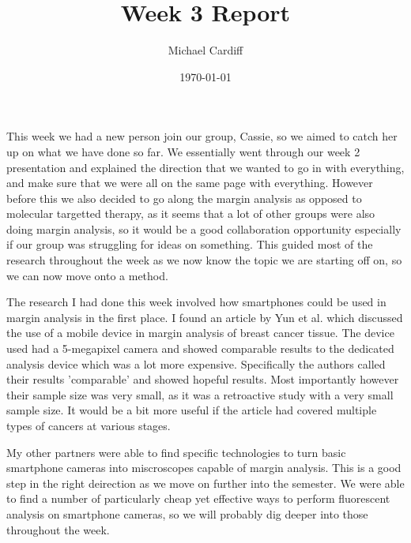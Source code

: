 \documentclass[12pt]{article}
\title{Week 3 Report}
\author{Michael Cardiff}
\date{\today}
\begin{document}
\maketitle

This week we had a new person join our group, Cassie, so we aimed to catch her up on what we have done so far. We essentially went through our week 2 presentation and explained the direction that we wanted to go in with everything, and make sure that we were all on the same page with everything. However before this we also decided to go along the margin analysis as opposed to molecular targetted therapy, as it seems that a lot of other groups were also doing margin analysis, so it would be a good collaboration opportunity especially if our group was struggling for ideas on something. This guided most of the research throughout the week as we now know the topic we are starting off on, so we can now move onto a method.

The research I had done this week involved how smartphones could be used in margin analysis in the first place. I found an article by Yun et al. which discussed the use of a mobile device in margin analysis of breast cancer tissue. The device used had a 5-megapixel camera and showed comparable results to the dedicated analysis device which was a lot more expensive. Specifically the authors called their results 'comparable' and showed hopeful results. Most importantly however their sample size was very small, as it was a retroactive study with a very small sample size. It would be a bit more useful if the article had covered multiple types of cancers at various stages.

My other partners were able to find specific technologies to turn basic smartphone cameras into miscroscopes capable of margin analysis. This is a good step in the right deirection as we move on further into the semester. We were able to find a number of particularly cheap yet effective ways to perform fluorescent analysis on smartphone cameras, so we will probably dig deeper into those throughout the week.
\end{document}
